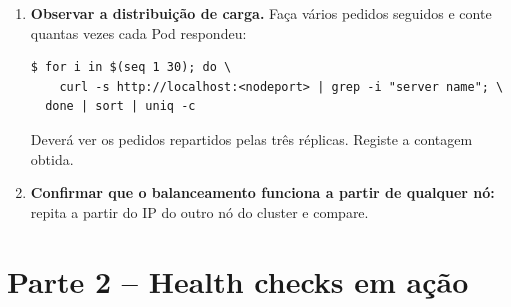 \documentclass[11pt,a4paper]{article}
\begin{document}
\begin{enumerate}[label=\arabic*.]
  \item \textbf{Observar a distribuição de carga.} Faça vários pedidos seguidos e conte quantas vezes cada Pod respondeu:
\begin{lstlisting}
$ for i in $(seq 1 30); do \
    curl -s http://localhost:<nodeport> | grep -i "server name"; \
  done | sort | uniq -c
\end{lstlisting}
  Deverá ver os pedidos repartidos pelas três réplicas. Registe a contagem obtida.

  \item \textbf{Confirmar que o balanceamento funciona a partir de qualquer nó:} repita a partir do IP do outro nó do cluster e compare.

\end{enumerate}

\section{Parte 2 -- Health checks em ação}
\end{document}
